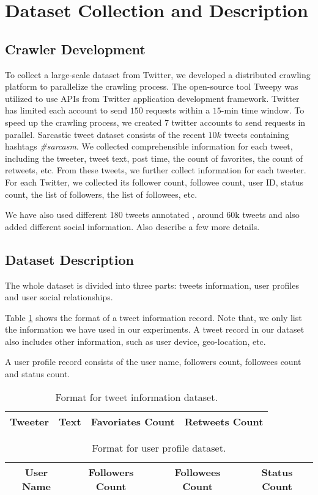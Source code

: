 \section{Dataset Collection and Description}
\label{sec:dataset}
\subsection{Crawler Development}
To collect a large-scale dataset from Twitter, we developed a distributed crawling platform to parallelize the crawling process. The open-source tool Tweepy was utilized to use APIs from Twitter application development framework. Twitter has limited each account to send $150$ requests within a $15$-min time window. To speed up the crawling process, we created $7$ twitter accounts to send requests in parallel. Sarcastic tweet dataset consists of the recent $10k$ tweets containing hashtags \emph{\#sarcasm}. We collected comprehensible information for each tweet, including the tweeter, tweet text, post time, the count of favorites, the count of retweets, etc. From these tweets, we further collect information for each tweeter. For each Twitter, we collected its follower count, followee count, user ID, status count, the list of followers, the list of followees, etc.

We have also used different 180 tweets annotated \cite{davidov10}, around 60k tweets \cite{tomas14} and also added different social information. Also describe a few more details.\\

\subsection{Dataset Description}
The whole dataset is divided into three parts: tweets information, user profiles and user social relationships.

Table \ref{tab:tweet information} shows the format of a tweet information record. Note that, we only list the information we have used in our experiments. A tweet record in our dataset also includes other information, such as user device, geo-location, etc. 

A user profile record consists of the user name, followers count, followees count and status count. 

\begin{table}[htpb]
\centering
\begin{tabular}{|c|c|c|c|}
\hline
Tweeter  & Text  & Favoriates Count & Retweets Count \\
\hline
\end{tabular}
\caption{Format for tweet information dataset.}
\label{tab:tweet information}
\end{table}

\begin{table}[htpb]
\centering
\begin{tabular}{|c|c|c|c|}
\hline
User Name & Followers Count & Followees Count & Status Count \\
\hline
\end{tabular}
\caption{Format for user profile dataset.}
\label{tab:user profile}
\end{table}